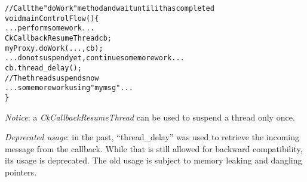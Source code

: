 \begin{alltt}
// Call the "doWork" method and wait until it has completed
void mainControlFlow() \{
  ...perform some work...
  CkCallbackResumeThread cb;
  myProxy.doWork(...,cb);
  ...do not suspend yet, continue some more work...
  cb.thread_delay();
  // The thread suspends now
  ...some more work using "mymsg"...
\}
\end{alltt}

{\em Notice}: a {\em CkCallbackResumeThread} can be used to suspend a thread
only once.

{\em Deprecated usage}: in the past, ``thread_delay'' was used to retrieve the
incoming message from the callback. While that is still allowed for backward
compatibility, its usage is deprecated. The old usage is subject to memory
leaking and dangling pointers.






